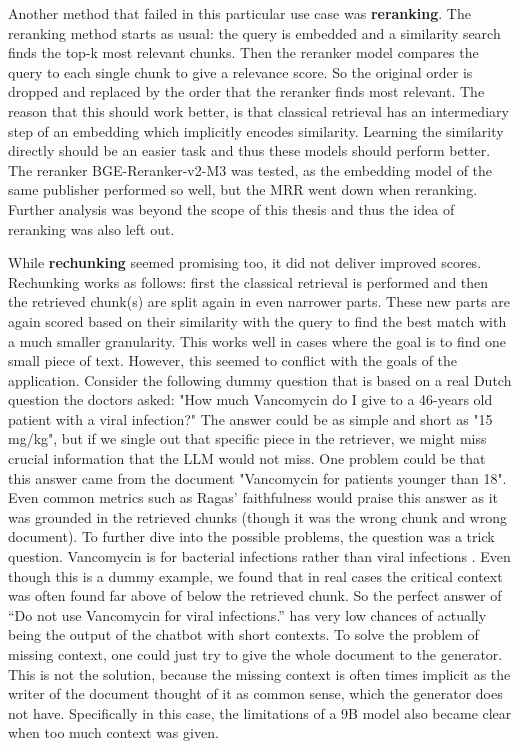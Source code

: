 Another method that failed in this particular use case was \textbf{reranking}. The reranking method starts as usual: the query is embedded and a similarity search finds the top-k most relevant chunks. Then the reranker model compares the query to each single chunk to give a relevance score. So the original order is dropped and replaced by the order that the reranker finds most relevant. The reason that this should work better, is that classical retrieval has an intermediary step of an embedding which implicitly encodes similarity. Learning the similarity directly should be an easier task and thus these models should perform better. The reranker BGE-Reranker-v2-M3 \cite{chen2024bge} was tested, as the embedding model of the same publisher performed so well, but the MRR went down when reranking. Further analysis was beyond the scope of this thesis and thus the idea of reranking was also left out.

While \textbf{rechunking} seemed promising too, it did not deliver improved scores. Rechunking works as follows: first the classical retrieval is performed and then the retrieved chunk(s) are split again in even narrower parts. These new parts are again scored based on their similarity with the query to find the best match with a much smaller granularity. This works well in cases where the goal is to find one small piece of text. However, this seemed to conflict with the goals of the application. Consider the following dummy question that is based on a real Dutch question the doctors asked: "How much Vancomycin do I give to a 46-years old patient with a viral infection?" The answer could be as simple and short as "15 mg/kg", but if we single out that specific piece in the retriever, we might miss crucial information that the LLM would not miss. One problem could be that this answer came from the document "Vancomycin for patients younger than 18". Even common metrics such as Ragas' \cite{es2024ragas} faithfulness would praise this answer as it was grounded in the retrieved chunks (though it was the wrong chunk and wrong document). To further dive into the possible problems, the question was a trick question. Vancomycin is for bacterial infections rather than viral infections \cite{vancomycin_wikipedia}. Even though this is a dummy example, we found that in real cases the critical context was often found far above of below the retrieved chunk. So the perfect answer of ``Do not use Vancomycin for viral infections.'' has very low chances of actually being the output of the chatbot with short contexts. To solve the problem of missing context, one could just try to give the whole document to the generator. This is not the solution, because the missing context is often times implicit as the writer of the document thought of it as common sense, which the generator does not have. Specifically in this case, the limitations of a 9B model also became clear when too much context was given.

